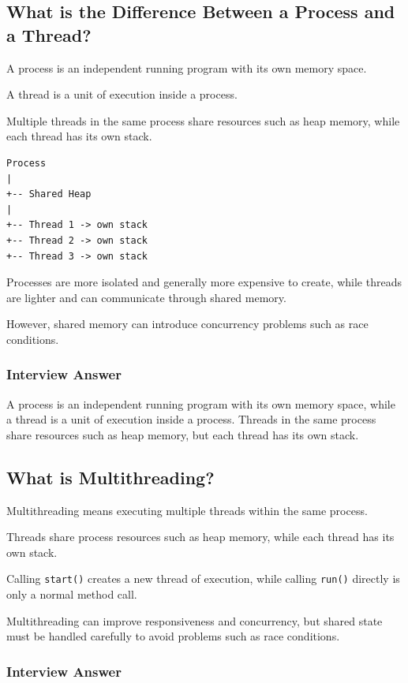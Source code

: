 \documentclass[12pt,a4paper]{article}
\begin{document}
\subsection{What is the Difference Between a Process and a Thread?}

A process is an independent running program with its own memory space.

A thread is a unit of execution inside a process.

Multiple threads in the same process share resources such as heap memory,
while each thread has its own stack.

\begin{verbatim}
Process
|
+-- Shared Heap
|
+-- Thread 1 -> own stack
+-- Thread 2 -> own stack
+-- Thread 3 -> own stack
\end{verbatim}

Processes are more isolated and generally more expensive to create, while
threads are lighter and can communicate through shared memory.

However, shared memory can introduce concurrency problems such as race
conditions.

\subsubsection*{Interview Answer}

A process is an independent running program with its own memory space,
while a thread is a unit of execution inside a process. Threads in the same
process share resources such as heap memory, but each thread has its own
stack.

\subsection{What is Multithreading?}

Multithreading means executing multiple threads within the same process.

Threads share process resources such as heap memory, while each thread has
its own stack.



Calling \texttt{start()} creates a new thread of execution, while calling
\texttt{run()} directly is only a normal method call.

Multithreading can improve responsiveness and concurrency, but shared state
must be handled carefully to avoid problems such as race conditions.

\subsubsection*{Interview Answer}
\end{document}
